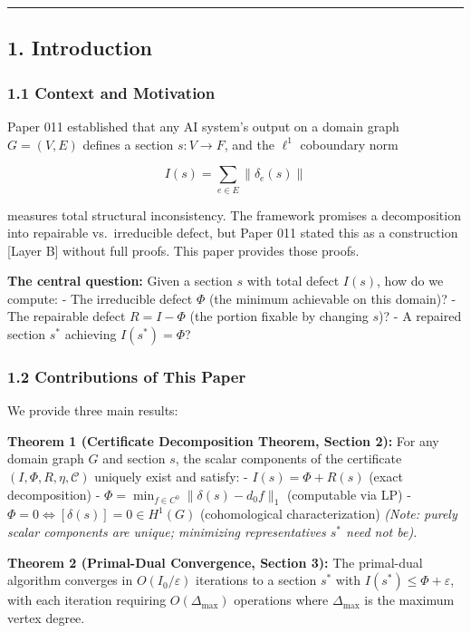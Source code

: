 \documentclass[
]{article}
\begin{document}
\begin{center}\rule{0.5\linewidth}{0.5pt}\end{center}

\subsection{1. Introduction}\label{introduction}

\subsubsection{1.1 Context and Motivation}\label{context-and-motivation}

Paper 011 established that any AI system's output on a domain graph
\(G = (V, E)\) defines a section \(s: V \to F\), and the \(\ell^1\)
coboundary norm

\[I(s) = \sum_{e \in E} \|\delta_e(s)\|\]

measures total structural inconsistency. The framework promises a
decomposition into repairable vs.~irreducible defect, but Paper 011
stated this as a construction {[}Layer B{]} without full proofs. This
paper provides those proofs.

\textbf{The central question:} Given a section \(s\) with total defect
\(I(s)\), how do we compute: - The irreducible defect \(\Phi\) (the
minimum achievable on this domain)? - The repairable defect
\(R = I - \Phi\) (the portion fixable by changing \(s\))? - A repaired
section \(s^*\) achieving \(I(s^*) = \Phi\)?

\subsubsection{1.2 Contributions of This
Paper}\label{contributions-of-this-paper}

We provide three main results:

\textbf{Theorem 1 (Certificate Decomposition Theorem, Section 2):} For
any domain graph \(G\) and section \(s\), the scalar components of the
certificate \((I, \Phi, R, \eta, \mathcal{C})\) uniquely exist and
satisfy: - \(I(s) = \Phi + R(s)\) (exact decomposition) -
\(\Phi = \min_{f \in C^0} \|\delta(s) - d_0 f\|_1\) (computable via LP)
- \(\Phi = 0 \iff [\delta(s)] = 0 \in H^1(G)\) (cohomological
characterization) \emph{(Note: purely scalar components are unique;
minimizing representatives \(s^*\) need not be).}

\textbf{Theorem 2 (Primal-Dual Convergence, Section 3):} The primal-dual
algorithm converges in \(O(I_0 / \varepsilon)\) iterations to a section
\(s^*\) with \(I(s^*) \leq \Phi + \varepsilon\), with each iteration
requiring \(O(\Delta_{\max})\) operations where \(\Delta_{\max}\) is the
maximum vertex degree.
\end{document}
